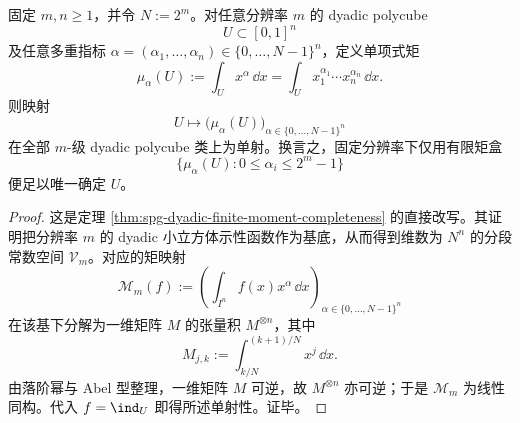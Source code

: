 \begin{theorem}\label{thm:xi-time-part9fa-dyadic-finite-moment-completeness}
固定 \(m,n\ge 1\)，并令 \(N:=2^m\)。对任意分辨率 \(m\) 的 dyadic polycube
\[
U\subset [0,1]^n
\]
及任意多重指标 \(\alpha=(\alpha_1,\dots,\alpha_n)\in\{0,\dots,N-1\}^n\)，定义单项式矩
\[
\mu_\alpha(U):=\int_U x^\alpha\,\dd x
=
\int_U x_1^{\alpha_1}\cdots x_n^{\alpha_n}\,\dd x.
\]
则映射
\[
U\longmapsto \bigl(\mu_\alpha(U)\bigr)_{\alpha\in\{0,\dots,N-1\}^{n}}
\]
在全部 \(m\)-级 dyadic polycube 类上为单射。换言之，固定分辨率下仅用有限矩盒
\[
\{\mu_\alpha(U):0\le \alpha_i\le 2^m-1\}
\]
便足以唯一确定 \(U\)。
\end{theorem}
\begin{proof}
这是定理 \ref{thm:spg-dyadic-finite-moment-completeness} 的直接改写。其证明把分辨率 \(m\) 的 dyadic 小立方体示性函数作为基底，从而得到维数为 \(N^n\) 的分段常数空间 \(\mathcal V_m\)。对应的矩映射
\[
\mathcal M_m(f):=
\left(\int_{I^n} f(x)x^\alpha\,\dd x\right)_{\alpha\in\{0,\dots,N-1\}^{n}}
\]
在该基下分解为一维矩阵 \(M\) 的张量积 \(M^{\otimes n}\)，其中
\[
M_{j,k}:=\int_{k/N}^{(k+1)/N}x^j\,\dd x.
\]
由落阶幂与 Abel 型整理，一维矩阵 \(M\) 可逆，故 \(M^{\otimes n}\) 亦可逆；于是 \(\mathcal M_m\) 为线性同构。代入 \(f=\ind_U\) 即得所述单射性。证毕。
\end{proof}

